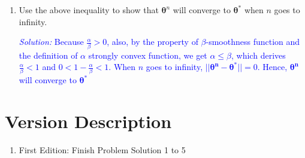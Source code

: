 \documentclass{article}
\def\solColor{blue}
\begin{document}
\begin{enumerate}
 \item Use the above inequality to show that $\boldsymbol{\theta}^n$ will converge to $\boldsymbol{\theta}^*$ when $n$ goes to infinity.

    \textcolor{\solColor}{\textit{Solution:} 
Because $\frac{\alpha}{\beta}>0$, also, by the property of $\beta$-smoothness function and the definition of $\alpha$ strongly convex function, we get $\alpha \leq \beta$, which derives $\frac{\alpha}{\beta}<1$ and $0<1-\frac{\alpha}{\beta}<1$. When $n$ goes to infinity, $||\boldsymbol{\theta^n}-\boldsymbol{\theta^*}||=0$. Hence, $\boldsymbol{\theta^n}$ will converge to $\boldsymbol{\theta^*}$
}
 \end{enumerate}

 \section*{Version Description}
 \begin{enumerate}
     \item First Edition: Finish Problem Solution 1 to 5
 \end{enumerate}
\end{document}
